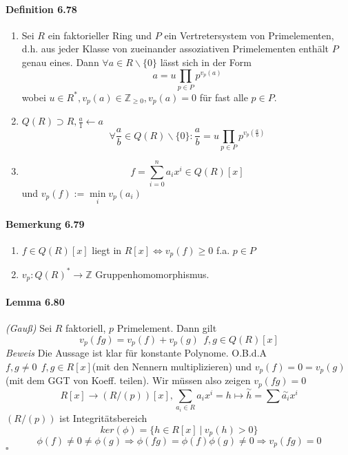 \documentclass{scrartcl}
\newcommand{\s}[1]{\overset{\sim}{#1}} %
\newcommand{\us}[2]{\underset{#1}{#2}} %
\newcommand{\Z}{\mathbb{Z}}
\begin{document}
\paragraph{Definition 6.78}
\begin{enumerate}
\item Sei $R$ ein faktorieller Ring und $P$ ein Vertretersystem von Primelementen,
d.h. aus jeder Klasse von zueinander assoziativen Primelementen enthält $P$
genau eines. Dann $\forall a \in R\backslash\{0\}$ lässt sich in der Form
\[
  a = u \prod_{p\in P}p^{v_p(a)}
\]
wobei $u \in R^*, v_p(a) \in \Z_{\geq 0}, v_p(a)=0$ für fast alle
$p\in P$.
\item $Q(R) \supset R, \frac{a}{1} \leftarrow a$
  \[
    \forall \frac{a}{b} \in Q(R)\backslash\{0\}: \frac{a}{b} = u\prod_{p\in
      P}p^{v_p(\frac{a}{b})}
  \]
\item
  \[
    f = \sum_{i=0}^na_ix^i \in Q(R)[x]
  \]
  und $v_p(f):=\us{i}{\min}v_p(a_i)$
\end{enumerate}

\paragraph{Bemerkung 6.79}
\begin{enumerate}
\item $f \in Q(R)[x]$ liegt in $R[x] \iff v_p(f) \geq 0$ f.a. $p\in P$
\item $v_p: Q(R)^* \to \Z$ Gruppenhomomorphismus.
\end{enumerate}

\paragraph{Lemma 6.80} \textit{(Gauß)} Sei $R$ faktoriell, $p$ Primelement. Dann
gilt
\[
  v_p(fg)=v_p(f)+v_p(g) ~~f,g \in Q(R)[x]
\]
\textit{Beweis}
Die Aussage ist klar für konstante Polynome. O.B.d.A $f,g \neq 0~~f,g\in
R[x]$(mit den Nennern multiplizieren) und $v_p(f)=0=v_p(g)$ (mit dem GGT von
Koeff. teilen). Wir müssen also zeigen $v_p(fg)=0$
\[
  R[x] \longrightarrow (R/(p))[x],
  \us{a_i\in R}{\sum} a_ix^i=h \mapsto \s{h}=\sum \s{a_i}x^i
\]
$(R/(p))$ ist Integritätsbereich
\[
  ker(\phi) = \{h\in R[x]~|~v_p(h)>0\}
\]
\[
  \phi(f) \neq 0 \neq \phi(g) \Rightarrow \phi(fg) = \phi(f)\phi(g) \neq 0
  \Rightarrow v_p(fg)=0
\]
\hfill $\square$
\end{document}
